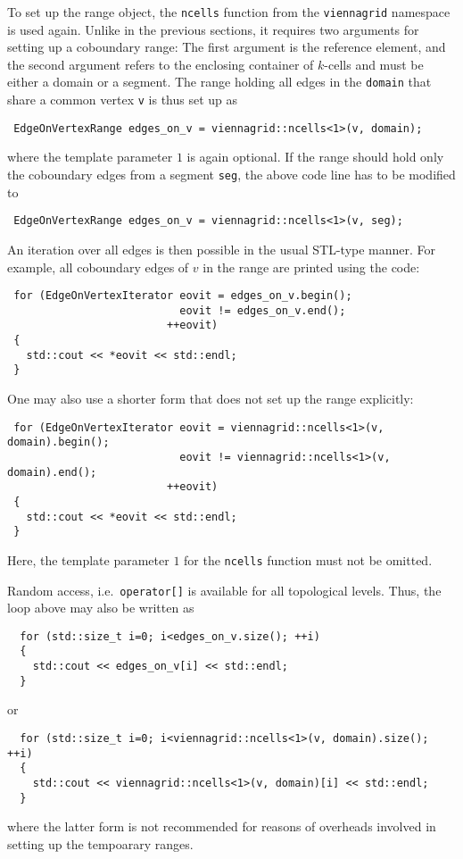 To set up the range object, the \lstinline|ncells| function from the \lstinline|viennagrid| namespace is used again. Unlike in the previous sections, it requires two arguments
for setting up a coboundary range: The first argument is the reference element, and the second argument refers to the enclosing container of $k$-cells and must be either a domain or a segment.
The range holding all edges in the \lstinline|domain| that share a common vertex \lstinline|v| is thus set up as
\begin{lstlisting}
 EdgeOnVertexRange edges_on_v = viennagrid::ncells<1>(v, domain);
\end{lstlisting}
where the template parameter $1$ is again optional.
If the range should hold only the coboundary edges from a segment \lstinline|seg|, the above code line has to be modified to
\begin{lstlisting}
 EdgeOnVertexRange edges_on_v = viennagrid::ncells<1>(v, seg);
\end{lstlisting}
An iteration over all edges is then possible in the usual STL-type manner. For example, all coboundary edges of $v$ in the range are printed using the code:
\begin{lstlisting}
 for (EdgeOnVertexIterator eovit = edges_on_v.begin();
                           eovit != edges_on_v.end();
                         ++eovit)
 {
   std::cout << *eovit << std::endl;
 }
\end{lstlisting}
One may also use a shorter form that does not set up the range explicitly:
\begin{lstlisting}
 for (EdgeOnVertexIterator eovit = viennagrid::ncells<1>(v, domain).begin();
                           eovit != viennagrid::ncells<1>(v, domain).end();
                         ++eovit)
 {
   std::cout << *eovit << std::endl;
 }
\end{lstlisting}
Here, the template parameter $1$ for the \lstinline|ncells| function must not be omitted.

Random access, i.e.~\lstinline|operator[]| is available for all topological levels. Thus, the loop above may also be written as
\begin{lstlisting}
  for (std::size_t i=0; i<edges_on_v.size(); ++i)
  {
    std::cout << edges_on_v[i] << std::endl;
  }
\end{lstlisting}
or 
\begin{lstlisting}
  for (std::size_t i=0; i<viennagrid::ncells<1>(v, domain).size(); ++i)
  {
    std::cout << viennagrid::ncells<1>(v, domain)[i] << std::endl;
  }
\end{lstlisting}
where the latter form is not recommended for reasons of overheads involved in setting up the tempoarary ranges.

